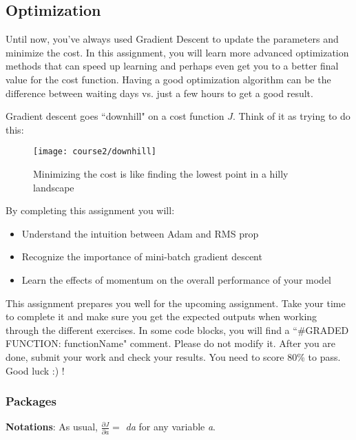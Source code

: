 \subsection{Optimization}

Until now, you've always used Gradient Descent to update the parameters and minimize the cost. In this assignment, you will learn more advanced optimization methods that can speed up learning and perhaps even get you to a better final value for the cost function. Having a good optimization algorithm can be the difference between waiting days vs. just a few hours to get a good result.

Gradient descent goes ``downhill" on a cost function  $J$. Think of it as trying to do this:

\begin{figure}[h]
\begin{center}
\texttt{[image: course2/downhill]}
\end{center}
\caption{ Minimizing the cost is like finding the lowest point in a hilly landscape}
\label{fig:downhill}
\end{figure}


By completing this assignment you will:
\begin{itemize}
\item Understand the intuition between Adam and RMS prop
\item Recognize the importance of mini-batch gradient descent
\item Learn the effects of momentum on the overall performance of your model
\end{itemize}

This assignment prepares you well for the upcoming assignment. Take your time to complete it and make sure you get the expected outputs when working through the different exercises. In some code blocks, you will find a ``\#GRADED FUNCTION: functionName" comment. Please do not modify it. After you are done, submit your work and check your results. You need to score 80\% to pass. Good luck :) !


\subsubsection{Packages}

{\textbf {Notations}}: As usual, $\frac{\partial J}{\partial a } = $ \emph{da} for any variable \emph{a}.

